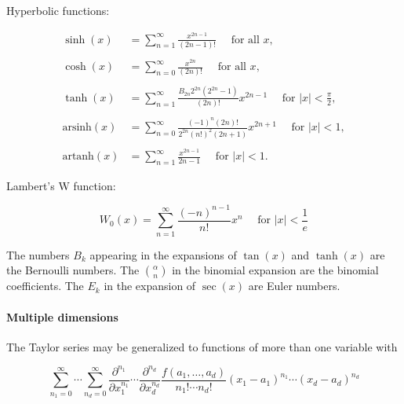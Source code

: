 Hyperbolic functions:



\begin{align}
\sinh(x) &= \sum _{n=1}^\infty\frac{x^{2n-1}}{(2n-1)!} \quad\text{ for all }x, \\\\ 

\cosh(x) &= \sum _{n=0}^\infty\frac{x^{2n}}{(2n)!} \quad\text{ for all }x, \\\\ 

\tanh(x) &= \sum _{n=1}^\infty\frac{B _{2n}2^{2n}(2^{2n}-1)}{(2n)!}x^{2n-1} \quad\text{ for }|x|<\frac{\pi}{2}, \\\\ 

\text{arsinh}(x) &= \sum _{n=0}^\infty\frac{(-1)^n(2n)!}{2^{2n}(n!)^2(2n+1)}x^{2n+1} \quad\text{ for }|x|<1, \\\\ 

\text{artanh}(x) &= \sum _{n=1}^\infty\frac{x^{2n-1}}{2n-1} \quad\text{ for }|x|<1.
\end{align}





Lambert's W function:



$$W _0(x)=\sum _{n=1}^\infty\frac{(-n)^{n-1}}{n!}x^n\quad\text{ for }|x|<\frac{1}{e}$$



The numbers $B _k$ appearing in the expansions of $\tan(x)$ and $\tanh(x)$ are the Bernoulli numbers. The $\binom{\alpha}{n}$ in the binomial expansion are the binomial coefficients. The $E _k$ in the expansion of $\sec(x)$ are Euler numbers.



\paragraph{Multiple dimensions}



The Taylor series may be generalized to functions of more than one variable with



$$\sum _{n _1=0}^\infty\cdots\sum _{n _d=0}^\infty\frac{\partial^{n _1}}{\partial x _1^{n _1}}\cdots\frac{\partial^{n _d}}{\partial x _d^{n _d}}\frac{f(a _1,\dots,a _d)}{n _1!\cdots n _d!}(x _1-a _1)^{n _1}\cdots (x _d-a _d)^{n _d}$$



